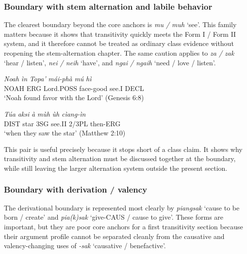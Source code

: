 \documentclass[
  11pt,
  a4paper,
]{article}
\newcommand{\tdim}[1]{\textit{#1}}
\newcommand{\tdimword}[1]{\textit{#1}}
\renewcommand{\textsc}[1]{{\footnotesize\MakeUppercase{#1}}}
\newcommand{\glossquote}[1]{`#1'}
\begin{document}
\subsubsection{Boundary with stem alternation and labile
behavior}\label{boundary-with-stem-alternation-and-labile-behavior}

The clearest boundary beyond the core anchors is \tdim{mu / muh}
\glossquote{see}. This family matters because it shows that transitivity
quickly meets the Form I / Form II system, and it therefore cannot be
treated as ordinary class evidence without reopening the
stem-alternation chapter. The same caution applies to \tdim{za / zak}
\glossquote{hear / listen}, \tdim{nei / neih} \glossquote{have}, and
\tdim{ngai / ngaih} \glossquote{need / love / listen}.

\begin{exe}
\ex \label{ex:trans-mu-gen6}
\gll \tdimword{Noah} \tdimword{ìn} \tdimword{Topa'} \tdimword{mái-phà} \tdimword{mú} \tdimword{hì} \\
     \textsc{noah} \textsc{erg} Lord.\textsc{poss} face-good see.\textsc{i} \textsc{decl} \\
\glt \glossquote{Noah found favor with the Lord} (Genesis 6:8)
\end{exe}

\begin{exe}
\ex \label{ex:trans-muh-matt2}
\gll \tdimword{Túa} \tdimword{aksi} \tdimword{à} \tdimword{mùh} \tdimword{ùh} \tdimword{cìang-ìn} \\
     \textsc{dist} star \textsc{3sg} see.\textsc{ii} 2/3PL then-\textsc{erg} \\
\glt \glossquote{when they saw the star} (Matthew 2:10)
\end{exe}

This pair is useful precisely because it stops short of a class claim.
It shows why transitivity and stem alternation must be discussed
together at the boundary, while still leaving the larger alternation
system outside the present section.

\subsubsection{Boundary with derivation /
valency}\label{boundary-with-derivation-valency}

The derivational boundary is represented most clearly by \tdim{piangsak}
\glossquote{cause to be born / create} and \tdim{pia(k)sak}
\glossquote{give-CAUS / cause to give}. These forms are important, but
they are poor core anchors for a first transitivity section because
their argument profile cannot be separated cleanly from the causative
and valency-changing uses of \tdim{-sak}
\glossquote{causative / benefactive}.
\end{document}
